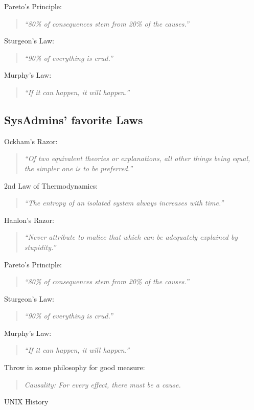 \documentclass[xga]{xdvislides}
\newcommand{\smallish}{\fontsize{18}{18}\selectfont}
\begin{document}
Pareto's Principle:
\begin{quote}
{\em ``80\% of consequences stem from 20\% of the causes.''}
\end{quote}

Sturgeon's Law:
\begin{quote}
{\em ``90\% of everything is crud.''}
\end{quote}

Murphy's Law:
\begin{quote}
{\em ``If it can happen, it will happen.''}
\end{quote}
\Normalsize


\subsection{SysAdmins' favorite Laws}
\smallish
Ockham's Razor:
\begin{quote}
{\em ``Of two equivalent theories or explanations, all other things being
equal, the simpler one is to be preferred.''}
\end{quote}

2nd Law of Thermodynamics:
\begin{quote}
{\em ``The entropy of an isolated system always increases with time.''}
\end{quote}

Hanlon's Razor:
\begin{quote}
{\em ``Never attribute to malice that which can be adequately explained by
stupidity.''}
\end{quote}

Pareto's Principle:
\begin{quote}
{\em ``80\% of consequences stem from 20\% of the causes.''}
\end{quote}

Sturgeon's Law:
\begin{quote}
{\em ``90\% of everything is crud.''}
\end{quote}

Murphy's Law:
\begin{quote}
{\em ``If it can happen, it will happen.''}
\end{quote}

Throw in some philosophy for good measure:
\begin{quote}
{\em Causality: For every effect, there must be a cause.}
\end{quote}
\Normalsize

\pagebreak

\vspace*{\fill}
\begin{center}
  \Hugesize
    UNIX History
	\hspace*{5mm}\blueline\\ [1em]
  \Normalsize
\end{center}
\vspace*{\fill}
\end{document}
